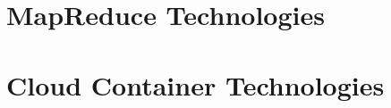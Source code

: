 \documentclass{format/laszewski}
\begin{document}
\maketitle



\part{MapReduce Technologies}




%

\part{Cloud Container Technologies}










%








%
%
%
%

 
%
%
%

%



%
%
%


\begin{comment}

















\end{comment}
\end{document}
